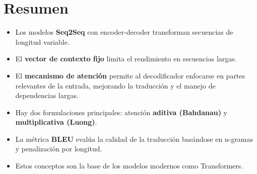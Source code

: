 \documentclass[12pt,a4paper,openany,oneside]{book}
\begin{document}
\section{Resumen}
\begin{itemize}
    \item Los modelos \textbf{Seq2Seq} con encoder-decoder transforman secuencias de longitud variable.
    \item El \textbf{vector de contexto fijo} limita el rendimiento en secuencias largas.
    \item El \textbf{mecanismo de atención} permite al decodificador enfocarse en partes relevantes de la entrada, mejorando la traducción y el manejo de dependencias largas.
    \item Hay dos formulaciones principales: atención \textbf{aditiva (Bahdanau)} y \textbf{multiplicativa (Luong)}.
    \item La métrica \textbf{BLEU} evalúa la calidad de la traducción basándose en n-gramas y penalización por longitud.
    \item Estos conceptos son la base de los modelos modernos como Transformers.
\end{itemize}
\end{document}
